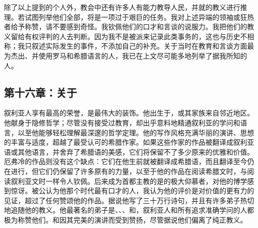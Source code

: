 除了以上提到的个人外，教会中还有许多人有能力教导人民，并就的教义进行推理。若试图列举他们全部，将是一项过于艰巨的任务。我对上述异端的领袖或狂热者给予称赞，请不要感到奇怪。我钦佩他们的口才和言谈的说服力。我把他们的教义留给有权评判的人去判断。因为我不是被派来记录此类事务的，这也与历史不相称；我只叙述实际发生的事件，不添加自己的补充。关于当时在教育和言谈方面最为杰出、并使用罗马和希腊语言的人，我已在上文尽可能多地列举了据我所知的人。\par


\subsection{第十六章：关于}

叙利亚人享有最高的荣誉，是最伟大的装饰。他出生于，或其家族来自邻近地区。他献身于隐修哲学；尽管没有接受过教育，却出乎意料地精通叙利亚的学问和语言，以至他能够轻松理解最深邃的哲学定理。他的写作风格充满华丽的演讲、思想的丰富与适度，超越了最受认可的希腊作家。如果这些作家的作品被翻译成叙利亚语或其他语言，并舍弃了希腊语的美感，它们将保留不了多少原来的优雅和价值。厄弗冷的作品则没有这个缺点：它们在他生前就被翻译成希腊语，而且翻译至今仍在进行，但它们仍保留了许多原有的力量，以至于他的作品在阅读希腊文时，与阅读叙利亚文时一样令人钦佩。后来成为首都主教的是的极大仰慕者，对他的博学感到惊讶。被公认为他那个时代最有口才的人，我认为他的评价是对价值的更有力的见证，超过了任何赞颂他的作品。据说他写了三十万行诗句，并且有许多弟子热切地追随他的教义。他最著名的弟子是、、、和，叙利亚人和所有追求准确学问的人都极为称赞他们。和因其完美的演讲而受到赞扬，尽管据说他们偏离了纯正教义。\par

